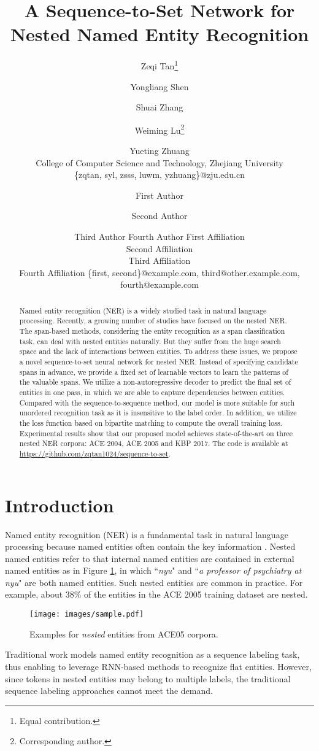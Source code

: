 \documentclass{article}
\title{A Sequence-to-Set Network for Nested Named Entity Recognition}
\author{
Zeqi Tan\footnote{Equal contribution.}
\and
Yongliang Shen
\and
Shuai Zhang
\and
Weiming Lu\footnote{Corresponding author.}
\and
Yueting Zhuang

\affiliations
College of Computer Science and Technology, Zhejiang University\\
\emails
\{zqtan, syl, zsss, luwm, yzhuang\}@zju.edu.cn
}
\author{
First Author
\and
Second Author\and
Third Author\And
Fourth Author
\affiliations
First Affiliation\\
Second Affiliation\\
Third Affiliation\\
Fourth Affiliation
\emails
\{first, second\}@example.com,
third@other.example.com,
fourth@example.com
}
\begin{document}
\maketitle

\begin{abstract}
Named entity recognition (NER) is a widely studied task in natural language processing. Recently, a growing number of studies have focused on the nested NER. The span-based methods, considering the entity recognition as a span classification task, can deal with nested entities naturally. But they suffer from the huge search space and the lack of interactions between entities. To address these issues, we propose a novel sequence-to-set neural network for nested NER. Instead of specifying candidate spans in advance, we provide a fixed set of learnable vectors to learn the patterns of the valuable spans. We utilize a non-autoregressive decoder to predict the final set of entities in one pass, in which we are able to capture dependencies between entities. Compared with the sequence-to-sequence method, our model is more suitable for such unordered recognition task as it is insensitive to the label order. In addition, we utilize the loss function based on bipartite matching to compute the overall training loss. Experimental results show that our proposed model achieves state-of-the-art on three nested NER corpora: ACE 2004, ACE 2005 and KBP 2017.
The code is available at \url{https://github.com/zqtan1024/sequence-to-set}.
\end{abstract}

\section{Introduction}
Named entity recognition (NER) is a fundamental task in natural language processing because named entities often contain the key information \cite{lample2016neural}. Nested named entities refer to that internal named entities are contained in external named entities as in Figure \ref{fig:example},  in which ``\textit{nyu}" and ``\textit{a professor of psychiatry at nyu}" are both named entities. Such nested entities are common in practice. For example, about 38\% of the entities in the ACE 2005 training dataset are nested. 
\begin{figure}[h]
  \centering
  \texttt{[image: images/sample.pdf]}
  \caption{Examples for \textit{nested} entities from ACE05 corpora.}
   \label{fig:example}
\end{figure}
Traditional work \cite{huang2015bidirectional,lample2016neural,chiu2016named} models named entity recognition as a sequence labeling task, thus enabling to leverage RNN-based methods to recognize flat entities. However, since tokens in nested entities may belong to multiple labels, the traditional sequence labeling approaches cannot meet the demand.
\end{document}
